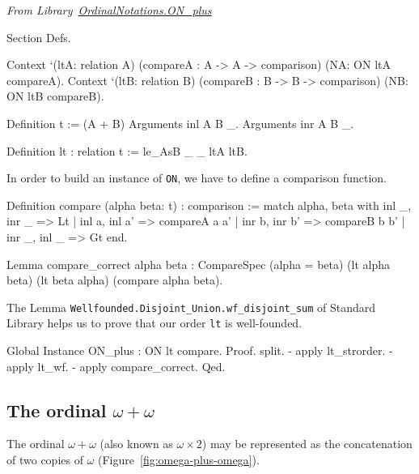 \vspace{4pt}
\noindent\emph{From Library~\href{../src/html/hydras.OrdinalNotations/ON_plus.html}{OrdinalNotations.ON\_plus}}


\begin{Coqsrc}
Section Defs.

  Context `(ltA: relation A)
          (compareA : A -> A -> comparison)
          (NA: ON ltA compareA).
  Context `(ltB: relation B)
          (compareB : B -> B -> comparison)
          (NB: ON ltB compareB).


Definition t := (A + B)%
Arguments inl  {A B} _.
Arguments inr  {A B} _.

Definition lt : relation t := le_AsB _ _ ltA ltB.
\end{Coqsrc}

In order to build an instance of \texttt{ON}, we have to define a comparison function.


\begin{Coqsrc}
Definition compare (alpha beta: t) : comparison :=
   match alpha, beta with
     inl _, inr _ => Lt
   | inl a, inl a' => compareA a a'
   | inr b, inr b' => compareB b b'
   | inr _, inl _ => Gt
  end.

Lemma compare_correct alpha beta :
    CompareSpec (alpha = beta) (lt alpha beta) (lt beta alpha)
              (compare alpha beta).
\end{Coqsrc}

The Lemma \texttt{Wellfounded.Disjoint\_Union.wf\_disjoint\_sum} of Standard Library
helps us to prove that our order \texttt{lt} is well-founded.


\begin{Coqsrc}
Global Instance ON_plus : ON lt compare.
Proof.
  split.
  - apply lt_strorder.
  -  apply lt_wf.
  - apply compare_correct.
Qed.
\end{Coqsrc}






\subsection{The ordinal \texorpdfstring{$\omega+\omega$}{omega + omega}}

The ordinal $\omega+\omega$ (also known as $\omega\times 2$) may be represented as the concatenation 
of two copies of $\omega$ (Figure~\ref{fig:omega-plus-omega}).

